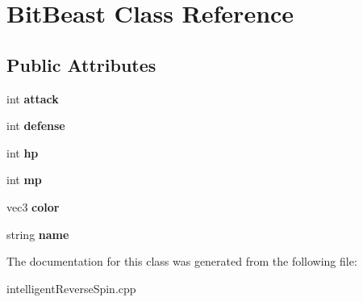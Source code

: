 \hypertarget{classBitBeast}{\section{Bit\-Beast Class Reference}
\label{classBitBeast}
}
\subsection*{Public Attributes}
\begin{DoxyCompactItemize}
\item 
\hypertarget{classBitBeast_a67e3628cc1ea84cab6b53f0ec69e8b33}{int {\bfseries attack}}\label{classBitBeast_a67e3628cc1ea84cab6b53f0ec69e8b33}

\item 
\hypertarget{classBitBeast_ab2f5345094d07a19ec27aa1abe524de0}{int {\bfseries defense}}\label{classBitBeast_ab2f5345094d07a19ec27aa1abe524de0}

\item 
\hypertarget{classBitBeast_ae5c5852b94bed233ea67504222fde0f1}{int {\bfseries hp}}\label{classBitBeast_ae5c5852b94bed233ea67504222fde0f1}

\item 
\hypertarget{classBitBeast_ae1d01c670cd2bf8a91c19122d0a40450}{int {\bfseries mp}}\label{classBitBeast_ae1d01c670cd2bf8a91c19122d0a40450}

\item 
\hypertarget{classBitBeast_a9d236793b3ccf3bfdea563c759a4851c}{vec3 {\bfseries color}}\label{classBitBeast_a9d236793b3ccf3bfdea563c759a4851c}

\item 
\hypertarget{classBitBeast_a1f62b4df442b97a62b7163bfe730c0c1}{string {\bfseries name}}\label{classBitBeast_a1f62b4df442b97a62b7163bfe730c0c1}

\end{DoxyCompactItemize}


The documentation for this class was generated from the following file\-:\begin{DoxyCompactItemize}
\item 
intelligent\-Reverse\-Spin.\-cpp\end{DoxyCompactItemize}
